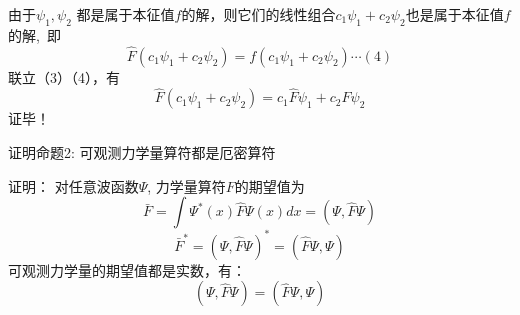 \begin{frame} 
    由于$\psi_1, \psi_2$ 都是属于本征值$f$的解，则它们的线性组合$c_1\psi_1+c_2\psi_2$也是属于本征值$f$的解, 即
    $$\hat{F}(c_1\psi_1+c_2\psi_2)=f(c_1\psi_1+c_2\psi_2)\cdots (4)$$
    联立（3）（4），有
    $$\hat{F}(c_1\psi_1+c_2\psi_2)=c_1\hat{F}\psi_1+c_2\hat{F}\psi_2$$
    证毕！
\end{frame} 

\begin{frame} 
    \begin{tcolorbox1}{证明命题2:}
        可观测力学量算符都是厄密算符  
    \end{tcolorbox1}
    \alert{证明：}
        对任意波函数$\Psi$, 力学量算符$F$的期望值为\\
        $$\bar{F}=\int \Psi^{*}(x) \hat{F} \Psi(x) d x=(\Psi,\hat{F} \Psi) $$
        $$\bar{F}^*=(\Psi, \hat{F} \Psi)^* = (\hat{F}\Psi, \Psi) $$
        可观测力学量的期望值都是实数，有：\\
        $$(\Psi,\hat{F}\Psi)=(\hat{F} \Psi, \Psi) $$
\end{frame} 

